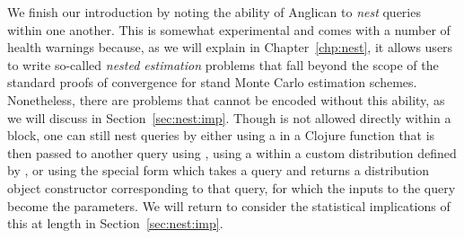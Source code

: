 We finish our introduction by noting the ability of Anglican to \emph{nest} queries within one another.  This
is somewhat experimental and comes with a number of health warnings because, as we will explain in Chapter~\ref{chp:nest},
it allows users to write so-called \emph{nested estimation} problems that fall beyond the scope of the standard
proofs of convergence for stand Monte Carlo estimation schemes. Nonetheless, there are problems that cannot
be encoded without this ability, as we will discuss in Section~\ref{sec:nest:imp}.
Though \doquery is not allowed directly within a  block, one can still nest queries by 
either using a \doquery in a Clojure function that is then passed to another query using {\small {}},
using a \doquery within a custom distribution defined by , or using the special form \conditional which
takes a query and returns a distribution object constructor corresponding to that query, 
for which the inputs to the query become the parameters.
We will return to consider the statistical implications of this at length in Section~\ref{sec:nest:imp}.